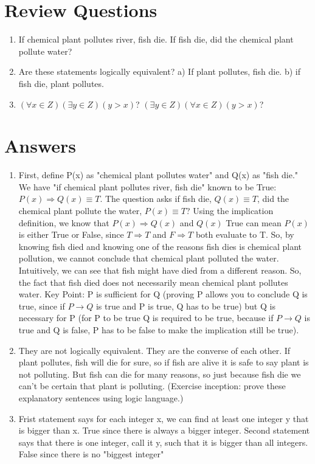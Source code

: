 \documentclass[11pt]{article}
\begin{document}
\section*{Review Questions}
\begin{enumerate}
\item If chemical plant pollutes river, fish die. If fish die, did the chemical plant pollute water?
\item Are these statements logically equivalent? a) If plant pollutes, fish die. b) if fish die, plant pollutes.
\item $(\forall x \in Z) (\exists y \in Z) (y > x)$? $(\exists y \in Z) (\forall x \in Z)  (y > x)$?
\end{enumerate}

\section*{Answers}
\begin{enumerate}
\item First, define P(x) as "chemical plant pollutes water" and Q(x) as "fish die." We have "if chemical plant pollutes river, fish die" known to be True: $P(x) \Rightarrow Q(x) \equiv T$. The question asks if fish die, $Q(x) \equiv T$, did the chemical plant pollute the water, $P(x) \equiv T$? Using the implication definition, we know that $P(x) \Rightarrow Q(x)$ and $Q(x)$ True can mean $P(x)$ is either True or False, since $T \Rightarrow T$ and $F \Rightarrow T$ both evaluate to T. So, by knowing fish died and knowing one of the reasons fish dies is chemical plant pollution, we cannot conclude that chemical plant polluted the water. Intuitively, we can see that fish might have died from a different reason. So, the fact that fish died does not necessarily mean chemical plant pollutes water. 
Key Point: P is sufficient for Q (proving P allows you to conclude Q is true, since if $P \rightarrow Q$ is true and P is true, Q has to be true) but Q is necessary for P (for P to be true Q is required to be true, because if $P \rightarrow Q$ is true and Q is false, P has to be false to make the implication still be true).
\item They are not logically equivalent. They are the converse of each other. If plant pollutes, fish will die for sure, so if fish are alive it is safe to say plant is not polluting. But fish can die for many reasons, so just because fish die we can't be certain that plant is polluting. (Exercise inception: prove these explanatory sentences using logic language.)
\item Frist statement says for each integer x, we can find at least one integer y that is bigger than x. True since there is always a bigger integer. Second statement says that there is one integer, call it y, such that it is bigger than all integers. False since there is no "biggest integer"
\end{enumerate}
\end{document}

